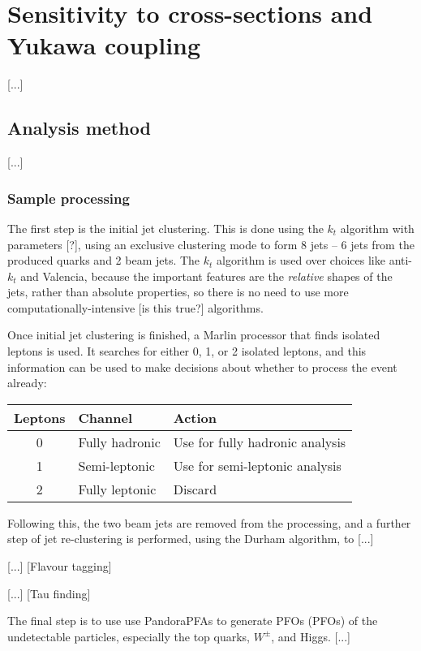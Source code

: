 \section{Sensitivity to cross-sections and Yukawa coupling}
[...]

\subsection{Analysis method}
[...]

\subsubsection{Sample processing}

The first step is the initial jet clustering. This is done using the $k_t$ algorithm with parameters [?], using an exclusive clustering mode to form 8 jets -- 6 jets from the produced quarks and 2 beam jets. The $k_t$ algorithm is used over choices like anti-$k_t$ and Valencia, because the important features are the \emph{relative} shapes of the jets, rather than absolute properties, so there is no need to use more computationally-intensive [is this true?] algorithms.

Once initial jet clustering is finished, a Marlin processor that finds isolated leptons is used. It searches for either 0, 1, or 2 isolated leptons, and this information can be used to make decisions about whether to process the event already:

\begin{table}[htp]
\centering
	\begin{tabular}{ | c | l | l | }
	\hline
	Leptons & Channel & Action \\ \hline
	0 & Fully hadronic & Use for fully hadronic analysis \\ \hline
	1 & Semi-leptonic & Use for semi-leptonic analysis \\ \hline
	2 & Fully leptonic & Discard \\ \hline
	\end{tabular}
\end{table}

Following this, the two beam jets are removed from the processing, and a further step of jet re-clustering is performed, using the Durham algorithm, to [...] %

[...] [Flavour tagging]

[...] [Tau finding]

The final step is to use use PandoraPFAs to generate \acrlong{PFO}s (\acrshort{PFO}s) of the undetectable particles, especially the top quarks, $W^\pm$, and Higgs. [...]

